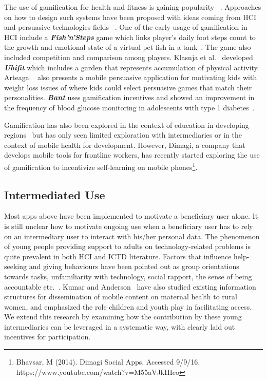\documentclass{sig-alternate}
\begin{document}
The use of gamification for health and fitness is gaining popularity ~\cite{lister2014:just}. Approaches on how to design such systems have been proposed with ideas coming from HCI~\cite{li2010:stage} and persuasive technologies fields ~\cite{fogg2009:behaviour,Oinas-kukkonen:psd,Oinas-Kukkonen:foundation}. One of the early usage of gamification in HCI include a \emph{\textbf{Fish'n'Steps}} game which links player's daily foot steps count to the growth and emotional state of a virtual pet fish in a tank~\cite{lin2006:fish}. The game also included competition and comparison among players. Klasnja et al.~\cite{klasnja2009:using} developed \emph{\textbf{Ubifit}} which includes a garden that represents accumulation of physical activity. Arteaga ~\cite{arteaga2010:persuasive} also presents a mobile persuasive application for motivating kids with weight loss issues of where kids could select persuasive games that match their personalities. \emph{\textbf{Bant}} uses gamification incentives and showed an improvement in the frequency of blood glucose monitoring in adolescents with type 1 diabetes~\cite{cafazzo2012:bant}. 

Gamification has also been explored in the context of education in developing regions~\cite{kam2008designing,botha2015icts} but has only seen limited exploration with intermediaries or in the context of mobile health for development.  However, Dimagi, a company that develops mobile tools for frontline workers, has recently started exploring the use of gamification to incentivize self-learning on mobile phones\footnote{Bhavsar, M (2014). Dimagi Social Apps. Accessed 9/9/16. https://www.youtube.com/watch?v=M55aVJkHIco}.

\subsection{Intermediated Use}
Most apps above have been implemented to motivate a beneficiary user alone. It is still unclear how to motivate ongoing use when a beneficiary user has to rely on an intermediary user to interact with his/her personal data. The phenomenon of young people providing support to adults on technology-related problems is quite prevalent in both HCI and ICTD literature. Factors that influence help-seeking and giving behaviours have been pointed out as group orientations towards tasks, unfamiliarity with technology, social rapport, the sense of being accountable etc.~\cite{sambasivan2010,poole:chh,kiesler:twi,parikh2006}. Kumar and Anderson~\cite{kumar2015mobile} have also studied existing information structures for dissemination of mobile content on maternal health to rural women, and emphasized the role children and youth play in facilitating access. 
We extend this research by examining how the contribution by these young intermediaries can be leveraged in a systematic way, with clearly laid out incentives for participation.  
\end{document}
